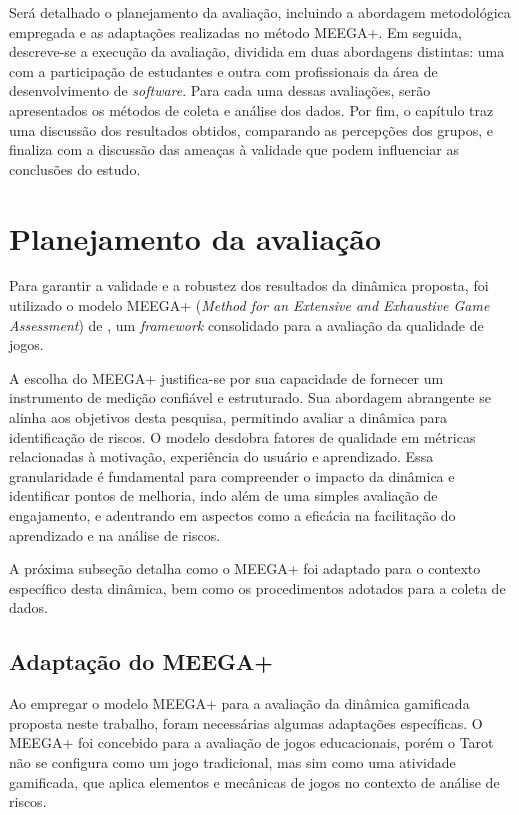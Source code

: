 \documentclass[
	12pt,
	openright,
	twoside,
	a4paper,
	english,
	brazil
	]{abntex2}
\begin{document}
Será detalhado o planejamento da avaliação, incluindo a abordagem metodológica empregada e as adaptações realizadas no método MEEGA+. Em seguida, descreve-se a execução da avaliação, dividida em duas abordagens distintas: uma com a participação de estudantes e outra com profissionais da área de desenvolvimento de \textit{software}. Para cada uma dessas avaliações, serão apresentados os métodos de coleta e análise dos dados. Por fim, o capítulo traz uma discussão dos resultados obtidos, comparando as percepções dos grupos, e finaliza com a discussão das ameaças à validade que podem influenciar as conclusões do estudo.

\section{Planejamento da avaliação}

Para garantir a validade e a robustez dos resultados da dinâmica proposta, foi utilizado o modelo MEEGA+ (\textit{Method for an Extensive and Exhaustive Game Assessment}) de , um \textit{framework} consolidado para a avaliação da qualidade de jogos.

A escolha do MEEGA+ justifica-se por sua capacidade de fornecer um instrumento de medição confiável e estruturado. Sua abordagem abrangente se alinha aos objetivos desta pesquisa, permitindo avaliar a dinâmica para identificação de riscos. O modelo desdobra fatores de qualidade em métricas relacionadas à motivação, experiência do usuário e aprendizado. Essa granularidade é fundamental para compreender o impacto da dinâmica e identificar pontos de melhoria, indo além de uma simples avaliação de engajamento, e adentrando em aspectos como a eficácia na facilitação do aprendizado e na análise de riscos.

A próxima subseção detalha como o MEEGA+ foi adaptado para o contexto específico desta dinâmica, bem como os procedimentos adotados para a coleta de dados.

\subsection{Adaptação do MEEGA+}

Ao empregar o modelo MEEGA+ para a avaliação da dinâmica gamificada proposta neste trabalho, foram necessárias algumas adaptações específicas. O MEEGA+ foi concebido para a avaliação de jogos educacionais, porém o Tarot não se configura como um jogo tradicional, mas sim como uma atividade gamificada, que aplica elementos e mecânicas de jogos no contexto de análise de riscos.
\end{document}
